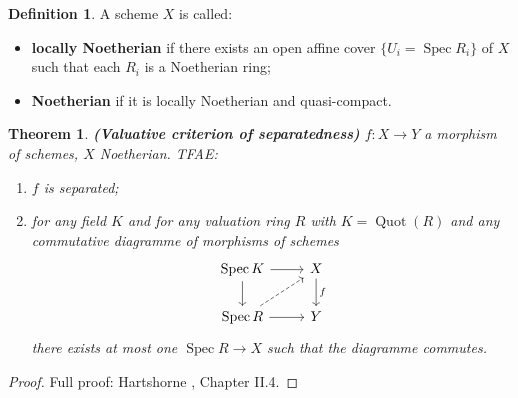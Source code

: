 \documentclass[12pt]{article}
\DeclareMathOperator{\Spec}{Spec}
\DeclareMathOperator{\Quot}{Quot}
\newtheorem*{theorem}{Theorem}
\theoremstyle{definition}
\newtheorem*{definition}{Definition}
\begin{document}
\begin{definition}
A scheme $X$ is called:
\begin{itemize}
\item \textbf{locally Noetherian} if there exists an open affine cover $\{U_i=\Spec R_i\}$ of $X$ such that each $R_i$ is a Noetherian ring;
\item \textbf{Noetherian} if it is locally Noetherian and quasi-compact.
\end{itemize}
\end{definition}

\begin{theorem}
\emph{\textbf{(Valuative criterion of separatedness)}} $f:X\rightarrow Y$ a morphism of schemes, $X$ Noetherian. TFAE:
\begin{enumerate}[label=\arabic*)]
\item\label{separated_morphism} $f$ is separated;
\item\label{uniqueness_limit} for any field $K$ and for any valuation ring $R$ with $K=\Quot(R)$ and any commutative diagramme of morphisms of schemes
\[\begin{tikzcd}\Spec K\arrow[r]\arrow[d]&X\arrow[d,"f"]\\\Spec R\arrow[r]\arrow[ru,dashed]&Y\end{tikzcd}\]
there exists at most one $\Spec R\rightarrow X$ such that the diagramme commutes.
\end{enumerate}
\end{theorem}

\begin{proof}
Full proof: Hartshorne \cite{hartshorne2013algebraic}, Chapter II.4.
\end{proof}
\end{document}
